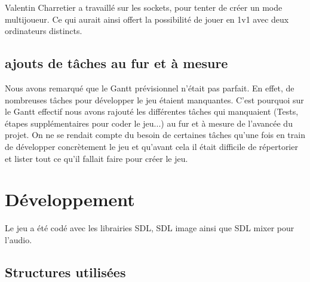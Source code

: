 \documentclass[a4paper,11pt]{article}
\begin{document}
Valentin Charretier a travaillé sur les sockets, pour tenter de créer un mode multijoueur. Ce qui aurait ainsi offert la possibilité de jouer en 1v1 avec deux
ordinateurs distincts.\\
\subsection{ajouts de tâches au fur et à mesure}
Nous avons remarqué que le Gantt prévisionnel n'était pas parfait. En effet, de nombreuses
tâches pour développer le jeu étaient manquantes. C'est pourquoi sur le Gantt effectif nous avons rajouté les différentes tâches
qui manquaient (Tests, étapes supplémentaires pour coder le jeu...) au fur et à mesure de l'avancée du projet. On ne se rendait compte du besoin de certaines
tâches qu'une fois en train de développer concrètement le jeu et qu'avant cela il était difficile de répertorier et lister tout ce qu'il fallait faire
pour créer le jeu.\\

\section{Développement}
Le jeu a été codé avec les librairies SDL, SDL image ainsi que SDL mixer pour l'audio.
\subsection{Structures utilisées}
\end{document}
